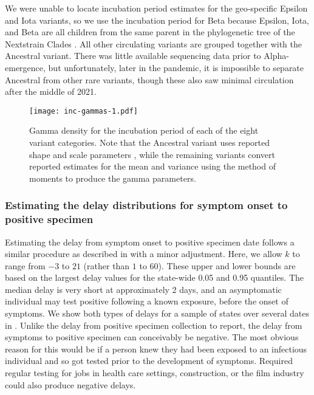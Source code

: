 We were unable to locate incubation period estimates for the geo-specific
Epsilon and Iota variants, so we use the incubation period for Beta because
Epsilon, Iota, and Beta are all children from the same parent in the
phylogenetic tree of the Nextstrain Clades \citep{hodcroft2021covariants}. All
other circulating variants are grouped together with the Ancestral variant.
There was little available sequencing data prior to Alpha-emergence, but
unfortunately, later in the pandemic, it is impossible to separate Ancestral
from other rare variants, though these also saw minimal circulation after
the middle of 2021.

\begin{figure}[!tb]
\centering
    \texttt{[image: inc-gammas-1.pdf]}
    \caption{Gamma density for the incubation period of each of the eight
    variant categories. Note that the Ancestral variant uses reported shape and
    scale parameters \citep{tindale2020evidence}, while the remaining variants
    convert reported estimates for the mean and variance
    \citep{tanaka2022shorter,grant2022impact,ogata2022shorter} using the method
    of moments to produce the gamma parameters.}
    \label{fig:inc_gammas}
\end{figure}





\subsubsection{Estimating the delay distributions for symptom onset to positive specimen}
\label{supp:delay-sops}


Estimating the delay from symptom onset to positive specimen date follows a
similar procedure as described in  with a minor
adjustment. Here, we allow $k$ to range from $-3$ to $21$ (rather than $1$ to
$60$). These upper and lower bounds are based on the largest delay values for
the state-wide 0.05 and 0.95 quantiles. The median
delay is very short at approximately 2 days, and an asymptomatic individual may
test positive following a known exposure, before the onset of symptoms. We show
both types of delays for a sample of states over several dates in
. Unlike the delay from positive specimen collection
to report, the delay from symptoms to positive specimen can conceivably be
negative. The most obvious reason for this would be if a person knew they had been
exposed to an infectious individual and so got tested prior to the development
of symptoms. Required regular testing for jobs in health care settings,
construction, or the film industry could also produce negative delays.


